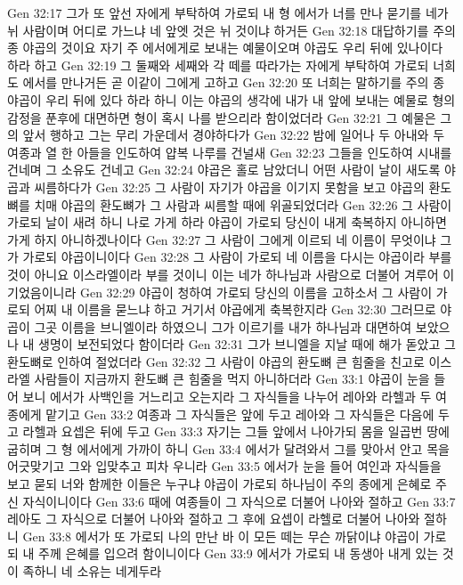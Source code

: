 Gen 32:17  그가 또 앞선 자에게 부탁하여 가로되 내 형 에서가 너를 만나 묻기를 네가 뉘 사람이며 어디로 가느냐 네 앞엣 것은 뉘 것이냐 하거든
Gen 32:18  대답하기를 주의 종 야곱의 것이요 자기 주 에서에게로 보내는 예물이오며 야곱도 우리 뒤에 있나이다 하라 하고
Gen 32:19  그 둘째와 세째와 각 떼를 따라가는 자에게 부탁하여 가로되 너희도 에서를 만나거든 곧 이같이 그에게 고하고
Gen 32:20  또 너희는 말하기를 주의 종 야곱이 우리 뒤에 있다 하라 하니 이는 야곱의 생각에 내가 내 앞에 보내는 예물로 형의 감정을 푼후에 대면하면 형이 혹시 나를 받으리라 함이었더라
Gen 32:21  그 예물은 그의 앞서 행하고 그는 무리 가운데서 경야하다가
Gen 32:22  밤에 일어나 두 아내와 두 여종과 열 한 아들을 인도하여 얍복 나루를 건널새
Gen 32:23  그들을 인도하여 시내를 건네며 그 소유도 건네고
Gen 32:24  야곱은 홀로 남았더니 어떤 사람이 날이 새도록 야곱과 씨름하다가
Gen 32:25  그 사람이 자기가 야곱을 이기지 못함을 보고 야곱의 환도뼈를 치매 야곱의 환도뼈가 그 사람과 씨름할 때에 위골되었더라
Gen 32:26  그 사람이 가로되 날이 새려 하니 나로 가게 하라 야곱이 가로되 당신이 내게 축복하지 아니하면 가게 하지 아니하겠나이다
Gen 32:27  그 사람이 그에게 이르되 네 이름이 무엇이냐 그가 가로되 야곱이니이다
Gen 32:28  그 사람이 가로되 네 이름을 다시는 야곱이라 부를 것이 아니요 이스라엘이라 부를 것이니 이는 네가 하나님과 사람으로 더불어 겨루어 이기었음이니라
Gen 32:29  야곱이 청하여 가로되 당신의 이름을 고하소서 그 사람이 가로되 어찌 내 이름을 묻느냐 하고 거기서 야곱에게 축복한지라
Gen 32:30  그러므로 야곱이 그곳 이름을 브니엘이라 하였으니 그가 이르기를 내가 하나님과 대면하여 보았으나 내 생명이 보전되었다 함이더라
Gen 32:31  그가 브니엘을 지날 때에 해가 돋았고 그 환도뼈로 인하여 절었더라
Gen 32:32  그 사람이 야곱의 환도뼈 큰 힘줄을 친고로 이스라엘 사람들이 지금까지 환도뼈 큰 힘줄을 먹지 아니하더라
Gen 33:1  야곱이 눈을 들어 보니 에서가 사백인을 거느리고 오는지라 그 자식들을 나누어 레아와 라헬과 두 여종에게 맡기고
Gen 33:2  여종과 그 자식들은 앞에 두고 레아와 그 자식들은 다음에 두고 라헬과 요셉은 뒤에 두고
Gen 33:3  자기는 그들 앞에서 나아가되 몸을 일곱번 땅에 굽히며 그 형 에서에게 가까이 하니
Gen 33:4  에서가 달려와서 그를 맞아서 안고 목을 어긋맞기고 그와 입맞추고 피차 우니라
Gen 33:5  에서가 눈을 들어 여인과 자식들을 보고 묻되 너와 함께한 이들은 누구냐 야곱이 가로되 하나님이 주의 종에게 은혜로 주신 자식이니이다
Gen 33:6  때에 여종들이 그 자식으로 더불어 나아와 절하고
Gen 33:7  레아도 그 자식으로 더불어 나아와 절하고 그 후에 요셉이 라헬로 더불어 나아와 절하니
Gen 33:8  에서가 또 가로되 나의 만난 바 이 모든 떼는 무슨 까닭이냐 야곱이 가로되 내 주께 은혜를 입으려 함이니이다
Gen 33:9  에서가 가로되 내 동생아 내게 있는 것이 족하니 네 소유는 네게두라
